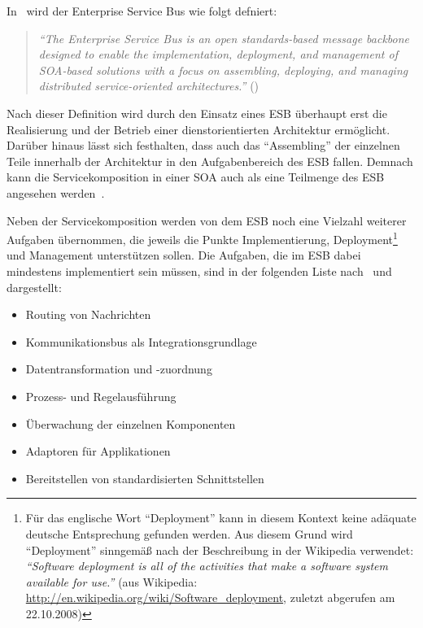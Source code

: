   In~\citep{web_services_principles_and_technology} wird der Enterprise Service Bus wie folgt defniert:
  
  \begin{quote}
    \label{def:enterprise_serivce_bus}
    \emph{"`The Enterprise Service Bus is an open standards-based message backbone designed to enable the implementation, deployment, and management of SOA-based solutions with a focus on assembling, deploying, and managing distributed service-oriented architectures."'} (\citep[S. 270]{web_services_principles_and_technology})
  \end{quote}
  
  Nach dieser Definition wird durch den Einsatz eines ESB überhaupt erst die Realisierung und der Betrieb einer dienstorientierten Architektur ermöglicht. Darüber hinaus lässt sich festhalten, dass auch das "`Assembling"' der einzelnen Teile innerhalb der Architektur in den Aufgabenbereich des ESB fallen. Demnach kann die Servicekomposition in einer SOA auch als eine Teilmenge des ESB angesehen werden~\citep[S. 3]{enterprise_service_bus}.

  Neben der Servicekomposition werden von dem ESB noch eine Vielzahl weiterer Aufgaben übernommen, die jeweils die Punkte Implementierung, Deployment\footnote{Für das englische Wort "`Deployment"' kann in diesem Kontext keine adäquate deutsche Entsprechung gefunden werden. Aus diesem Grund wird "`Deployment"' sinngemäß nach der Beschreibung in der Wikipedia verwendet: \emph{"`Software deployment is all of the activities that make a software system available for use."'} (aus Wikipedia: \url{http://en.wikipedia.org/wiki/Software_deployment}, zuletzt abgerufen am 22.10.2008)} und Management unterstützen sollen. Die Aufgaben, die im ESB dabei mindestens implementiert sein müssen, sind in der folgenden Liste nach~\citep[S. 137]{soa_goes_real} und~\citep[S. 146]{masak2007ssb} dargestellt:
  
  \begin{itemize}
    \item Routing von Nachrichten
    \item Kommunikationsbus als Integrationsgrundlage
    \item Datentransformation und -zuordnung
    \item Prozess- und Regelausführung
    \item Überwachung der einzelnen Komponenten
    \item Adaptoren für Applikationen
    \item Bereitstellen von standardisierten Schnittstellen
  \end{itemize}

